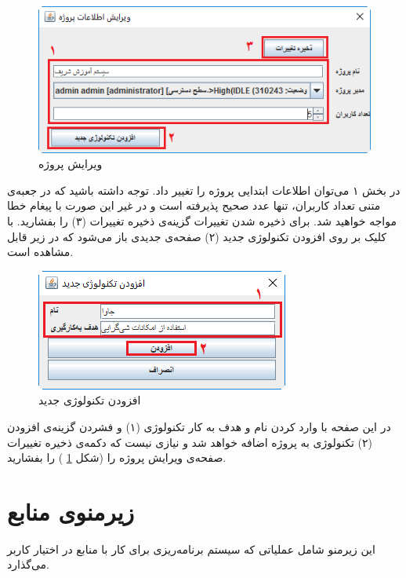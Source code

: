 \begin{figure}[H]
	\centering
	\includegraphics[scale=0.5]{img/manual/editProject}
	\caption{ویرایش پروژه}
	\label{f6}
\end{figure}
در بخش ۱ می‌توان اطلاعات ابتدایی پروژه را تغییر داد. توجه داشته باشید که در جعبه‌ی متنی تعداد کاربران، تنها عدد صحیح پذیرفته است و در غیر این صورت با پیغام خطا مواجه خواهید شد.  برای ذخیره شدن تغییرات گزینه‌ی ذخیره تغییرات (۳) را بفشارید. با کلیک بر روی افزودن تکنولوژی جدید (۲) صفحه‌ی جدیدی باز می‌شود که در زیر قابل مشاهده است.
\begin{figure}[H]
	\centering
	\includegraphics[scale=0.7]{img/manual/addTech}
	\caption{ افزودن تکنولوژی جدید}
	\label{f7}
\end{figure}
در این صفحه با وارد کردن نام و هدف به کار تکنولوژی (۱) و فشردن گزینه‌ی افزودن (۲) تکنولوژی به پروژه اضافه خواهد شد و نیازی نیست که دکمه‌ی ذخیره تغییرات صفحه‌ی ویرایش پروژه را (شکل
\ref{f6}
)
را بفشارید.

\newpage
\section{زیرمنوی منابع}
این زیرمنو شامل عملیاتی که سیستم برنامه‌ریزی برای کار با منابع در اختیار کاربر می‌گذارد.

